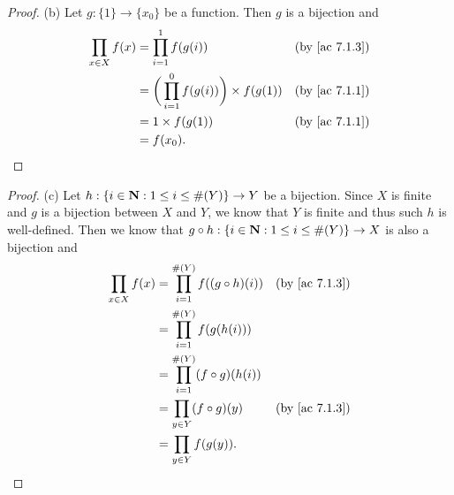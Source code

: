 \begin{proof}{(b)}
  Let \(g : \{1\} \to \{x_0\}\) be a function.
  Then \(g\) is a bijection and
  \begin{align*}
    \prod_{x \in X} f(x) & = \prod_{i = 1}^1 f(g(i))                            & \text{(by \cref{ac 7.1.3})} \\
                         & = \bigg(\prod_{i = 1}^0 f(g(i))\bigg) \times f(g(1)) & \text{(by \cref{ac 7.1.1})} \\
                         & = 1 \times f(g(1))                                   & \text{(by \cref{ac 7.1.1})} \\
                         & = f(x_0).
  \end{align*}
\end{proof}

\begin{proof}{(c)}
  Let \(h : \{i \in \mathbf{N} : 1 \leq i \leq \#(Y)\} \to Y\) be a bijection.
  Since \(X\) is finite and \(g\) is a bijection between \(X\) and \(Y\), we know that \(Y\) is finite and thus such \(h\) is well-defined.
  Then we know that \(g \circ h : \{i \in \mathbf{N} : 1 \leq i \leq \#(Y)\} \to X\) is also a bijection and
  \begin{align*}
    \prod_{x \in X} f(x) & = \prod_{i = 1}^{\#(Y)} f((g \circ h)(i)) & \text{(by \cref{ac 7.1.3})} \\
                         & = \prod_{i = 1}^{\#(Y)} f(g(h(i)))                                      \\
                         & = \prod_{i = 1}^{\#(Y)} (f \circ g)(h(i))                               \\
                         & = \prod_{y \in Y} (f \circ g)(y)          & \text{(by \cref{ac 7.1.3})} \\
                         & = \prod_{y \in Y} f(g(y)).
  \end{align*}
\end{proof}

